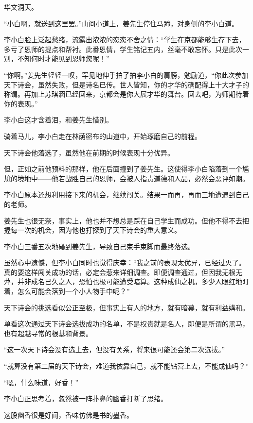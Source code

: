 
\begin{this_body}

华文洞天。

“小白啊，就送到这里罢。”山间小道上，姜先生停住马蹄，对身侧的李小白道。

李小白脸上泛起愁绪，流露出浓浓的恋恋不舍之情：“学生在京都能够生存下去，多亏了恩师的提点和帮衬。此番恩情，学生铭记五内，丝毫不敢忘怀。只是此次一别，不知何时才能见到恩师您呢！”

“你啊。”姜先生轻轻一叹，罕见地伸手拍了拍李小白的肩膀，勉励道，“你此次参加天下诗会，虽然失败，但是诗名已传。世人皆知，你的才华的确配得上十大才子的称谓。再加上苏琪涵已经回来，京都会是你大展才华的舞台。回去吧，为师期待着你的表现。”

李小白这才含着泪，和姜先生惜别。

骑着马儿，李小白走在林荫密布的山道中，开始琢磨自己的前程。

天下诗会他落选了，虽然他在前期的时候表现十分优异。

但，正如之前他预料的那样，他在后面撞到了姜先生。这使得李小白陷落到一个尴尬的境地中——他若战胜自己的恩师，会被人指责道德和人品，必然会恶评如潮。

李小白原本还想利用接下来的机会，继续闯关。结果一而再，再而三地遭遇到自己的老师。

姜先生也很无奈，事实上，他也并不想总是踩在自己学生而成功。但他不得不去把握每一次的机会，因为他也打探到了天下诗会的重大意义。

李小白三番五次地碰到姜先生，导致自己束手束脚而最终落选。

虽然心中遗憾，但李小白同时也觉得庆幸：“我之前的表现太优异，已经过火了。真的要这样闯关成功的话，必定会惹来详细调查。即便调查通过，但因我无根无萍，并非成名已久之人，恐怕也极可能遭受暗算。这种成仙之机，多少人眼红地盯着，怎么可能会落到一个小人物手中呢？”

天下诗会的挑选看似公正至极，但事实上有人的地方，就有暗幕，就有利益媾和。

单看这次通过天下诗会选拔成功的名单，不是权贵就是名人，即便是所谓的黑马，也有超越寻常的根基和背景。

“这一次天下诗会没有选上去，但没有关系，将来很可能还会第二次选拔。”

“就算没有第二届的天下诗会，难道我依靠自己，就不能钻营上去，不能成仙吗？”

“嗯，什么味道，好香！”

李小白正思考着，忽然被一阵扑鼻的幽香打断了思绪。

这股幽香很是好闻，香味仿佛是书的墨香。


\end{this_body}
